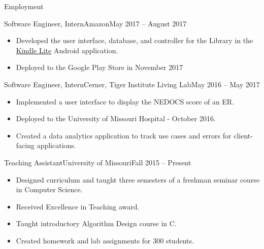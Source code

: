 \documentclass[]{mcdowellcv}
\begin{document}
    \begin{cvsection}{Employment}
        \begin{cvsubsection}{Software Engineer, Intern}{Amazon}{May 2017 -- August 2017}
            \begin{itemize}
            \item Developed the user interface, database, and controller for the Library in the \href{https://play.google.com/store/apps/details?id=com.amazon.klite&hl=en}{Kindle Lite} Android application.
            \item Deployed to the Google Play Store in November 2017
            \end{itemize}
        \end{cvsubsection}

        \begin{cvsubsection}{Software Engineer, Intern}{Cerner, Tiger Institute Living Lab}{May 2016 -- May 2017}		
            \begin{itemize}
                \item Implemented a user interface to display the NEDOCS score of an ER.
                \item Deployed to the University of Missouri Hospital - October 2016.
                \item Created a data analytics application to track use cases and errors for client-facing applications.
            \end{itemize}
        \end{cvsubsection}

        \begin{cvsubsection}{Teaching Assistant}{University of Missouri}{Fall 2015 -- Present}
            \begin{itemize}
                \item Designed curriculum and taught three semesters of a freshman seminar course in Computer Science.
                \item Received Excellence in Teaching award.
                 \item Taught introductory Algorithm Design course in C.
                \item Created homework and lab assignments for 300 students.
            \end{itemize}
        \end{cvsubsection}

    \end{cvsection}	
    
\end{document}

